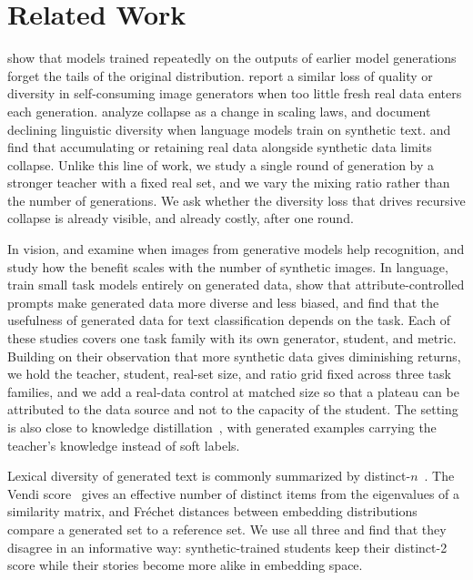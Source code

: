 \section{Related Work}
\label{sec:related}

\citet{shumailov2023curse,shumailov2024collapse} show that models trained repeatedly on the outputs of earlier model generations forget the tails of the original distribution.
\citet{alemohammad2024mad} report a similar loss of quality or diversity in self-consuming image generators when too little fresh real data enters each generation.
\citet{dohmatob2024tale} analyze collapse as a change in scaling laws, and \citet{guo2023curious} document declining linguistic diversity when language models train on synthetic text.
\citet{gerstgrasser2024inevitable} and \citet{bertrand2024stability} find that accumulating or retaining real data alongside synthetic data limits collapse.
Unlike this line of work, we study a single round of generation by a stronger teacher with a fixed real set, and we vary the mixing ratio rather than the number of generations.
We ask whether the diversity loss that drives recursive collapse is already visible, and already costly, after one round.

In vision, \citet{he2023synthetic} and \citet{azizi2023synthetic} examine when images from generative models help recognition, and \citet{fan2024scaling} study how the benefit scales with the number of synthetic images.
In language, \citet{ye2022zerogen} train small task models entirely on generated data, \citet{yu2023attributed} show that attribute-controlled prompts make generated data more diverse and less biased, and \citet{li2023synthetic} find that the usefulness of generated data for text classification depends on the task.
Each of these studies covers one task family with its own generator, student, and metric.
Building on their observation that more synthetic data gives diminishing returns, we hold the teacher, student, real-set size, and ratio grid fixed across three task families, and we add a real-data control at matched size so that a plateau can be attributed to the data source and not to the capacity of the student.
The setting is also close to knowledge distillation~\citep{hinton2015distilling}, with generated examples carrying the teacher's knowledge instead of soft labels.

Lexical diversity of generated text is commonly summarized by distinct-$n$~\citep{li2016diversity}.
The Vendi score~\citep{friedman2023vendi} gives an effective number of distinct items from the eigenvalues of a similarity matrix, and Fr\'echet distances between embedding distributions~\citep{heusel2017gans} compare a generated set to a reference set.
We use all three and find that they disagree in an informative way: synthetic-trained students keep their distinct-2 score while their stories become more alike in embedding space.
